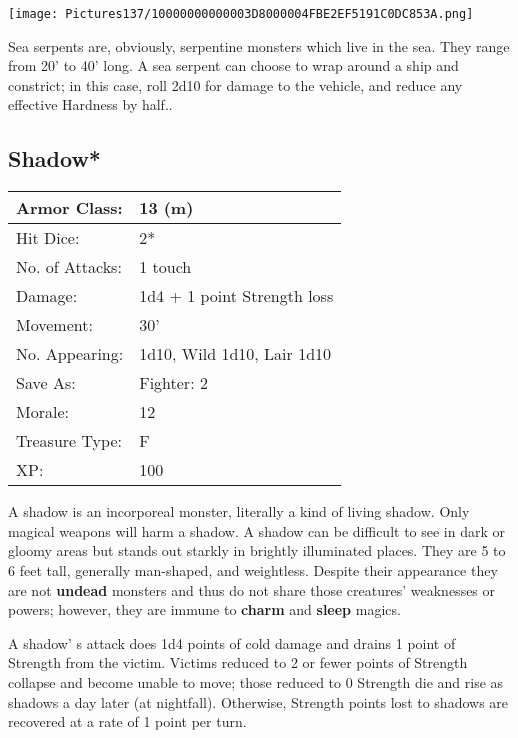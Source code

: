 \documentclass[a4paper,twoside,openany,10pt]{book}
\begin{document}
\begin{multicols}{2}
\begin{center} \texttt{[image: Pictures137/10000000000003D8000004FBE2EF5191C0DC853A.png]} \end{center}

Sea serpents are, obviously, serpentine monsters which live in the sea. They range from 20' to 40' long. A sea serpent can choose to wrap around a ship and constrict; in this case, roll 2d10 for damage to the vehicle, and reduce any effective Hardness by half..


\subsection*{Shadow*}\label{shadow}

\begin{tabularx}{0.50\textwidth}{@{}lX@{}}
Armor Class: & 13 (m) \\\hline
Hit Dice: & 2* \\\hline
No. of Attacks: & 1 touch \\\hline
Damage: & 1d4 + 1 point Strength loss \\\hline
Movement: & 30' \\\hline
No. Appearing: & 1d10, Wild 1d10, Lair 1d10 \\\hline
Save As: & Fighter: 2 \\\hline
Morale: & 12 \\\hline
Treasure Type: & F \\\hline
XP: & 100 \\\hline
\end{tabularx}\medskip

A shadow is an incorporeal monster, literally a kind of living shadow. Only magical weapons will harm a shadow. A shadow can be difficult to see in dark or gloomy areas but stands out starkly in brightly illuminated places. They are 5 to 6 feet tall, generally man-shaped, and weightless. Despite their appearance they are not \textbf{undead} monsters and thus do not share those creatures' weaknesses or powers; however, they are immune to \textbf{charm }and \textbf{sleep }magics.

A shadow' s attack does 1d4 points of cold damage and drains 1 point of Strength from the victim. Victims reduced to 2 or fewer points of Strength collapse and become unable to move; those reduced to 0 Strength die and rise as shadows a day later (at nightfall). Otherwise, Strength points lost to shadows are recovered at a rate of 1 point per turn.


\end{multicols}
\end{document}
